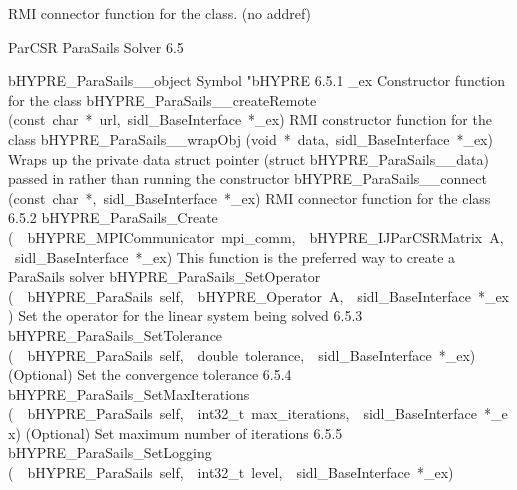 \documentclass{article}
\begin{document}
\begin{cxxentry}
\begin{cxxentry}
\begin{cxxvariable}
\begin{cxxdoc}
RMI connector function for the class. (no addref)
\end{cxxdoc}
\end{cxxvariable}
\end{cxxentry}
\begin{cxxentry}
{}
        {ParCSR ParaSails Solver}
        {}
        {
}
        {6.5}
\begin{cxxnames}
        {bHYPRE\_ParaSails\_\_object}
        {}
        {
Symbol "bHYPRE}
        {6.5.1}
        {\_ex}
        {}
        {
Constructor function for the class}
        {}
\label{cxx.6.5.11}
        {bHYPRE\_ParaSails\_\_createRemote}
        {(const\ char\ *\ url,\ sidl\_BaseInterface\ *\_ex)}
        {
RMI constructor function for the class}
        {}
\label{cxx.6.5.12}
        {bHYPRE\_ParaSails\_\_wrapObj}
        {(void\ *\ data,\ sidl\_BaseInterface\ *\_ex)}
        {
Wraps up the private data struct pointer (struct bHYPRE\_ParaSails\_\_data) passed in rather than running the constructor}
        {}
\label{cxx.6.5.13}
        {bHYPRE\_ParaSails\_\_connect}
        {(const\ char\ *,\ sidl\_BaseInterface\ *\_ex)}
        {
RMI connector function for the class}
        {6.5.2}
        {bHYPRE\_ParaSails\_Create}
        {(\ \ bHYPRE\_MPICommunicator\ mpi\_comm,\ \ bHYPRE\_IJParCSRMatrix\ A,\ \ sidl\_BaseInterface\ *\_ex)}
        {
This function is the preferred way to create a ParaSails solver}
        {}
\label{cxx.6.5.14}
        {bHYPRE\_ParaSails\_SetOperator}
        {(\ \ bHYPRE\_ParaSails\ self,\ \ bHYPRE\_Operator\ A,\ \ sidl\_BaseInterface\ *\_ex)}
        {
Set the operator for the linear system being solved}
        {6.5.3}
        {bHYPRE\_ParaSails\_SetTolerance}
        {(\ \ bHYPRE\_ParaSails\ self,\ \ double\ tolerance,\ \ sidl\_BaseInterface\ *\_ex)}
        {
(Optional) Set the convergence tolerance}
        {6.5.4}
        {bHYPRE\_ParaSails\_SetMaxIterations}
        {(\ \ bHYPRE\_ParaSails\ self,\ \ int32\_t\ max\_iterations,\ \ sidl\_BaseInterface\ *\_ex)}
        {
(Optional) Set maximum number of iterations}
        {6.5.5}
        {bHYPRE\_ParaSails\_SetLogging}
        {(\ \ bHYPRE\_ParaSails\ self,\ \ int32\_t\ level,\ \ sidl\_BaseInterface\ *\_ex)}

\end{cxxnames}
\end{cxxentry}
\end{cxxentry}
\end{document}
